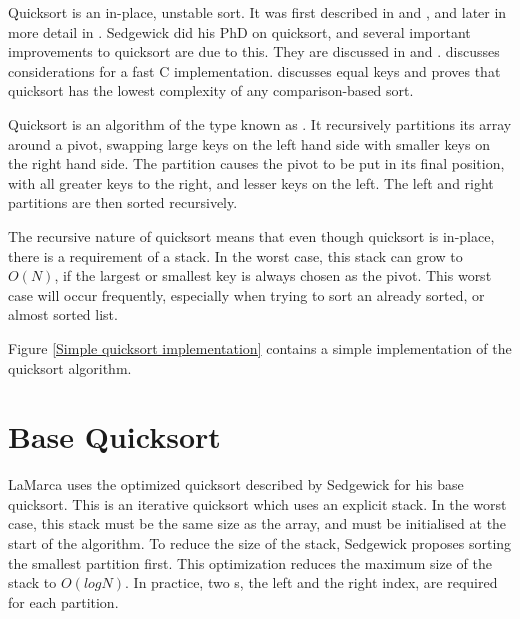 \label{quick}

Quicksort is an in-place, unstable sort. It was first described in
\cite{HoarePartition61} and \cite{HoareQuicksort61}, and later in more detail in
\cite{Hoare62}. Sedgewick did his PhD on quicksort, and several important
improvements to quicksort are due to this. They are discussed in
\cite{Sedgewick78} and \cite{Sedgewick02}. \cite{BentleyMcIlroy93} discusses
considerations for a fast C implementation. \cite{SedgewickBentley02} discusses
equal keys and proves that quicksort has the lowest complexity of any
comparison-based sort.

Quicksort is an algorithm of the type known as . It
recursively partitions its array around a pivot, swapping large keys on
the left hand side with smaller keys on the right hand side. The partition
causes the pivot to be put in its final position, with all greater keys to the
right, and lesser keys on the left. The left and right partitions are then
sorted recursively.

The recursive nature of quicksort means that even though quicksort is in-place,
there is a requirement of a stack. In the worst case, this stack can grow to
$O(N)$, if the largest or smallest key is always chosen as the pivot. This
worst case will occur frequently, especially when trying to sort an already
sorted, or almost sorted list.

Figure \vref{Simple quicksort implementation} contains a simple implementation of
the quicksort algorithm.


\section{Base Quicksort}

LaMarca uses the optimized quicksort described by Sedgewick for his base
quicksort. This is an iterative quicksort which uses an explicit stack. In the
worst case, this stack must be the same size as the array, and must be
initialised at the start of the algorithm. To reduce the size of the stack,
Sedgewick proposes sorting the smallest partition first. This optimization
reduces the maximum size of the stack to $O(logN)$. In practice, two s,
the left and the right index, are required for each partition.


